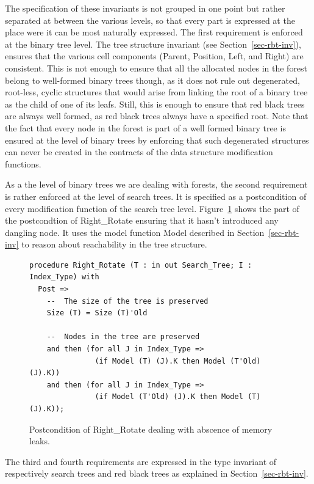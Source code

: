 \documentclass[11pt,a4paper]{article}
\begin{document}
The specification of these invariants is not grouped in one point but rather separated at between the various levels,
so that every part is expressed at the place were it can be most naturally expressed. The first requirement is
enforced at the binary tree level. The tree structure invariant (see Section~\ref{sec-rbt-inv}),
ensures that the various cell components (Parent, Position, Left, and Right) are consistent. This is not enough
to ensure that all the allocated nodes in the forest belong to well-formed binary trees though, as it does
not rule out degenerated, root-less, cyclic structures that would arise from linking the root of a binary tree as the
child of one of its leafs. Still, this is enough to ensure that red black trees are always well formed, as red black
trees always have a specified root. Note that the fact that every node in the forest is part of
a well formed binary tree is ensured at the level of binary trees by enforcing that such degenerated structures can
never be created in the contracts of the data structure modification functions.

As a the level of binary trees we are dealing with forests, the second requirement is rather enforced at the level of
search trees. It is specified as a postcondition of every modification function of the search tree level.
Figure~\ref{fig-spec-no-leak} shows the part of the postcondtion of Right\_Rotate ensuring that it hasn't introduced
any dangling node. It uses the model function Model described in Section~\ref{sec-rbt-inv} to reason about reachability
in the tree structure.

\begin{figure}[ht]
\begin{small}
\begin{lstlisting}
procedure Right_Rotate (T : in out Search_Tree; I : Index_Type) with
  Post =>
    --  The size of the tree is preserved
    Size (T) = Size (T)'Old

    --  Nodes in the tree are preserved
    and then (for all J in Index_Type =>
               (if Model (T) (J).K then Model (T'Old) (J).K))
    and then (for all J in Index_Type =>
               (if Model (T'Old) (J).K then Model (T) (J).K));
\end{lstlisting}
\end{small}
\caption{\label{fig-spec-no-leak} Postcondition of Right\_Rotate dealing with abscence of memory leaks.}
\end{figure}

The third and fourth requirements are expressed in the type invariant of respectively search trees and red black trees
as explained in Section~\ref{sec-rbt-inv}.
\end{document}
